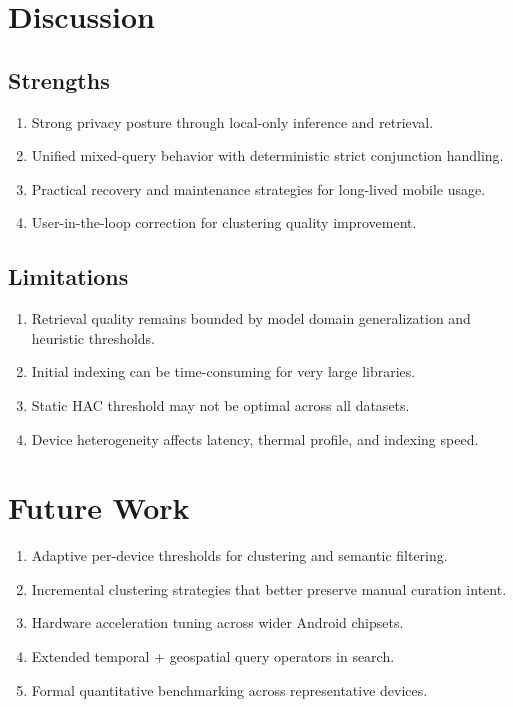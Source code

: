 \documentclass[conference]{IEEEtran}
\begin{document}
\section{Discussion}
\subsection{Strengths}
\begin{enumerate}
\item Strong privacy posture through local-only inference and retrieval.
\item Unified mixed-query behavior with deterministic strict conjunction handling.
\item Practical recovery and maintenance strategies for long-lived mobile usage.
\item User-in-the-loop correction for clustering quality improvement.
\end{enumerate}

\subsection{Limitations}
\begin{enumerate}
\item Retrieval quality remains bounded by model domain generalization and heuristic thresholds.
\item Initial indexing can be time-consuming for very large libraries.
\item Static HAC threshold may not be optimal across all datasets.
\item Device heterogeneity affects latency, thermal profile, and indexing speed.
\end{enumerate}

\section{Future Work}
\begin{enumerate}
\item Adaptive per-device thresholds for clustering and semantic filtering.
\item Incremental clustering strategies that better preserve manual curation intent.
\item Hardware acceleration tuning across wider Android chipsets.
\item Extended temporal + geospatial query operators in search.
\item Formal quantitative benchmarking across representative devices.
\end{enumerate}
\end{document}

